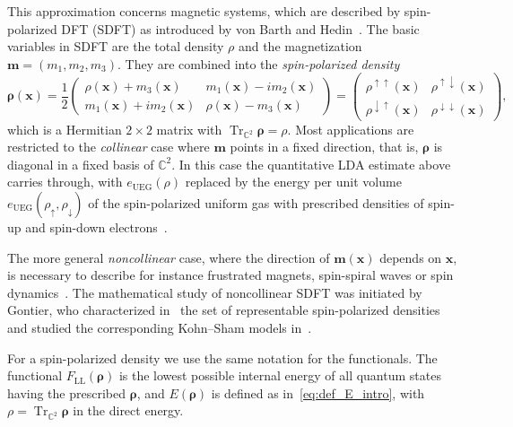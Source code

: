 \documentclass[final,reqno]{amsart}
\theoremstyle{remark}
\newcommand{\spu}{\uparrow}
\newcommand{\spd}{\downarrow}
\DeclareMathOperator{\Tr}{Tr}
\newcommand{\Trs}{\Tr_{\CC^2}}
\newcommand{\CC}{\mathbb{C}}
\newcommand{\LL}{\mathrm{LL}}
\newcommand{\UEG}{\mathrm{UEG}}
\begin{document}
This approximation concerns magnetic systems, which are described by spin-polarized DFT (SDFT) as introduced by von Barth and Hedin~\cite{von1972local}. The basic variables in SDFT are the total density $\rho$ and the magnetization $\mathbf{m}=(m_1,m_2,m_3)$. They are combined into the \emph{spin-polarized density}
$$
\bm{\rho}(\mathbf{x})=\frac{1}{2}\begin{pmatrix}\rho(\mathbf{x})+m_3(\mathbf{x})&m_1(\mathbf{x})-im_2(\mathbf{x})\\ m_1(\mathbf{x})+im_2(\mathbf{x})&\rho(\mathbf{x})-m_3(\mathbf{x})\end{pmatrix}=\begin{pmatrix}\rho^{\spu\spu}(\mathbf{x})&\rho^{\spu\spd}(\mathbf{x})\\ \rho^{\spd\spu}(\mathbf{x})&\rho^{\spd\spd}(\mathbf{x})\end{pmatrix},
$$
which is a Hermitian $2\times 2$ matrix with $\Trs\bm{\rho}=\rho$. Most applications are restricted to the \emph{collinear} case where $\mathbf{m}$ points in a fixed direction, that is, $\bm{\rho}$ is diagonal in a fixed basis of $\CC^2$. In this case the quantitative LDA estimate above carries through, with $e_\UEG(\rho)$ replaced by the energy per unit volume $e_\UEG(\rho_\spu,\rho_\spd)$ of the spin-polarized uniform gas with prescribed densities of spin-up and spin-down electrons~\cite[Remark~6]{lewin2020local}.

The more general \emph{noncollinear} case, where the direction of $\mathbf{m}(\mathbf{x})$ depends on $\mathbf{x}$, is necessary to describe for instance frustrated magnets, spin-spiral waves or spin dynamics~\cite{kubler1988density}. The mathematical study of noncollinear SDFT was initiated by Gontier, who characterized in~\cite{gontier2013n} the set of representable spin-polarized densities and studied the corresponding Kohn--Sham models in~\cite{gontier2015existence}.

For a spin-polarized density we use the same notation for the functionals. The functional $F_\LL(\bm{\rho})$ is the lowest possible internal energy of all quantum states having the prescribed $\bm{\rho}$, and $E(\bm{\rho})$ is defined as in~\cref{eq:def_E_intro}, with $\rho=\Trs\bm{\rho}$ in the direct energy.

\medskip
\end{document}
